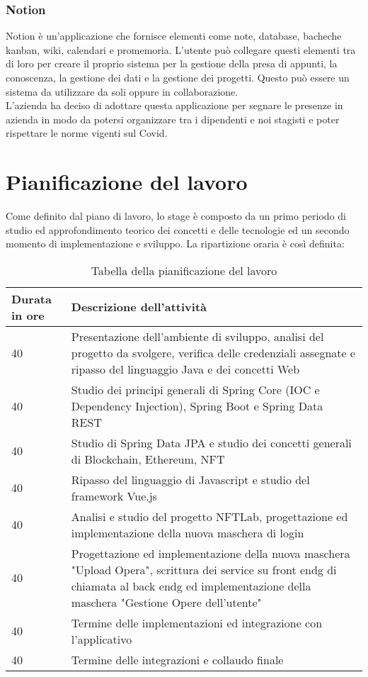 \subsubsection{Notion}
\label{subsubsec:notion}
Notion è un'applicazione che fornisce elementi come note, database, bacheche kanban, wiki, calendari e promemoria. L'utente può collegare questi elementi tra di loro per creare il proprio sistema per la gestione della presa di appunti, la conoscenza, la gestione dei dati e la gestione dei progetti. Questo può essere un sistema da utilizzare da soli oppure in collaborazione.\\
L'azienda ha deciso di adottare questa applicazione per segnare le presenze in azienda in modo da potersi organizzare tra i dipendenti e noi stagisti e poter rispettare le norme vigenti sul Covid.

\section{Pianificazione del lavoro}
\label{sec:pianificazione-lavoro}
Come definito dal piano di lavoro, lo stage è composto da un primo periodo di studio ed approfondimento teorico dei concetti e delle tecnologie ed un secondo momento di implementazione e sviluppo. La ripartizione oraria è così definita:
\begin{table}[H]
	\caption{Tabella della pianificazione del lavoro}
	\label{tab:pianificazione-del-lavoro}
	\renewcommand{\arraystretch}{1.6}
	\begin{tabularx}{\textwidth}{lX}
		\hline
		\textbf{Durata in ore} & \textbf{Descrizione dell'attività}\\
		\hline
		40 & Presentazione dell'ambiente di sviluppo, analisi del progetto da svolgere, verifica delle credenziali assegnate e ripasso del linguaggio Java e dei concetti Web\\
		\hline
		40 & Studio dei principi generali di Spring Core (IOC e Dependency Injection), Spring Boot e Spring Data REST \\
		\hline
		40 & Studio di Spring Data JPA e studio dei concetti generali di Blockchain, Ethereum, NFT\\
		\hline
		40 & Ripasso del linguaggio di Javascript e studio del framework Vue.js\\
		\hline
		40 & Analisi e studio del progetto NFTLab, progettazione ed implementazione della nuova maschera di login\\
		\hline
		40 & Progettazione ed implementazione della nuova maschera "Upload Opera", scrittura dei service su \gls{front endg} di chiamata al \gls{back endg} ed implementazione della maschera "Gestione Opere dell'utente"\\
		\hline
		40 & Termine delle implementazioni ed integrazione con l'applicativo\\
		\hline
		40 & Termine delle integrazioni e collaudo finale\\
		\hline
	\end{tabularx}
\end{table}%

